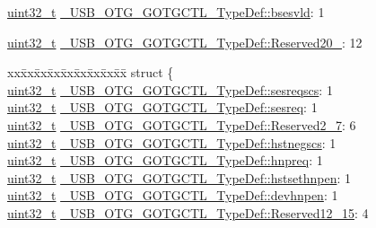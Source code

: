 \begin{DoxyCompactItemize}
\item 
\hyperlink{stdint_8h_a435d1572bf3f880d55459d9805097f62}{uint32\-\_\-t} \hyperlink{group___u_s_b___o_t_g___d_r_i_v_e_r_gaf855a8f6b69e3065e44e148d71cad9d9}{\-\_\-\-U\-S\-B\-\_\-\-O\-T\-G\-\_\-\-G\-O\-T\-G\-C\-T\-L\-\_\-\-Type\-Def\-::bsesvld}\-: 1
\item 
\hyperlink{stdint_8h_a435d1572bf3f880d55459d9805097f62}{uint32\-\_\-t} \hyperlink{group___u_s_b___o_t_g___d_r_i_v_e_r_ga2f71a4f5cc3e92d646e2488ba26e4e5c}{\-\_\-\-U\-S\-B\-\_\-\-O\-T\-G\-\_\-\-G\-O\-T\-G\-C\-T\-L\-\_\-\-Type\-Def\-::\-Reserved20\-\_}\-: 12
\item 
\begin{tabbing}
xx\=xx\=xx\=xx\=xx\=xx\=xx\=xx\=xx\=\kill
struct \{\\
\>\hyperlink{stdint_8h_a435d1572bf3f880d55459d9805097f62}{uint32\_t} \hyperlink{group___u_s_b___o_t_g___d_r_i_v_e_r_gab0d6bf182833ffbcb57a537824c74db0}{\_USB\_OTG\_GOTGCTL\_TypeDef::sesreqscs}: 1\\
\>\hyperlink{stdint_8h_a435d1572bf3f880d55459d9805097f62}{uint32\_t} \hyperlink{group___u_s_b___o_t_g___d_r_i_v_e_r_gaae14bcb1524970983dc360d7e3d79fea}{\_USB\_OTG\_GOTGCTL\_TypeDef::sesreq}: 1\\
\>\hyperlink{stdint_8h_a435d1572bf3f880d55459d9805097f62}{uint32\_t} \hyperlink{group___u_s_b___o_t_g___d_r_i_v_e_r_ga9821b352087a7b65db3080c50475eba8}{\_USB\_OTG\_GOTGCTL\_TypeDef::Reserved2\_7}: 6\\
\>\hyperlink{stdint_8h_a435d1572bf3f880d55459d9805097f62}{uint32\_t} \hyperlink{group___u_s_b___o_t_g___d_r_i_v_e_r_gab946d22c3ce448cb5400c80a67741c7d}{\_USB\_OTG\_GOTGCTL\_TypeDef::hstnegscs}: 1\\
\>\hyperlink{stdint_8h_a435d1572bf3f880d55459d9805097f62}{uint32\_t} \hyperlink{group___u_s_b___o_t_g___d_r_i_v_e_r_gaf3e9c6ede6612d1d7229ccc6d201a595}{\_USB\_OTG\_GOTGCTL\_TypeDef::hnpreq}: 1\\
\>\hyperlink{stdint_8h_a435d1572bf3f880d55459d9805097f62}{uint32\_t} \hyperlink{group___u_s_b___o_t_g___d_r_i_v_e_r_gaf0bba72b67cdc4421da620a2206119bb}{\_USB\_OTG\_GOTGCTL\_TypeDef::hstsethnpen}: 1\\
\>\hyperlink{stdint_8h_a435d1572bf3f880d55459d9805097f62}{uint32\_t} \hyperlink{group___u_s_b___o_t_g___d_r_i_v_e_r_gac620352539abc5d73a05b0bbcde5d82b}{\_USB\_OTG\_GOTGCTL\_TypeDef::devhnpen}: 1\\
\>\hyperlink{stdint_8h_a435d1572bf3f880d55459d9805097f62}{uint32\_t} \hyperlink{group___u_s_b___o_t_g___d_r_i_v_e_r_gaf538e4adf72524cf22a00097b438703b}{\_USB\_OTG\_GOTGCTL\_TypeDef::Reserved12\_15}: 4\\

\end{tabbing}
\end{DoxyCompactItemize}
